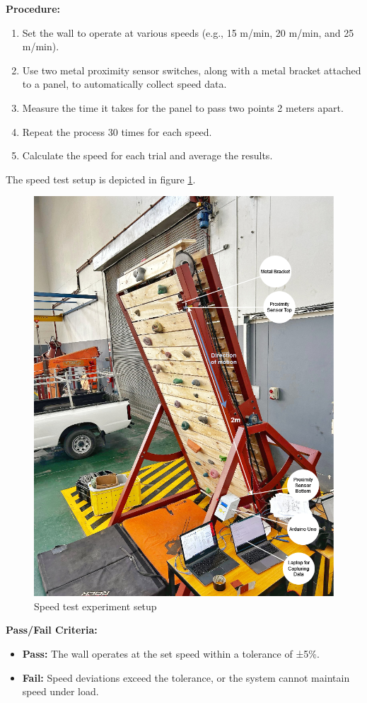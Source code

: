 \textbf{Procedure:}
\begin{enumerate}
    \item Set the wall to operate at various speeds (e.g., 15 m/min, 20 m/min, and 25 m/min).
    \item Use two metal proximity sensor switches, along with a metal bracket attached to a panel, to automatically collect speed data.
    \item Measure the time it takes for the panel to pass two points 2 meters apart.
    \item Repeat the process 30 times for each speed.
    \item Calculate the speed for each trial and average the results.
\end{enumerate}

The speed test setup is depicted in figure \ref{fig:speed-test-setup}.

\begin{figure}[h!]
    \centering
    \includegraphics[width=0.75\linewidth]{figs//testing/speed-test-setup.png}
    \caption{Speed test experiment setup}
    \label{fig:speed-test-setup}
\end{figure}

\textbf{Pass/Fail Criteria:}
\begin{itemize}
    \item \textbf{Pass:} The wall operates at the set speed within a tolerance of ±5\%.
    \item \textbf{Fail:} Speed deviations exceed the tolerance, or the system cannot maintain speed under load.
\end{itemize}

